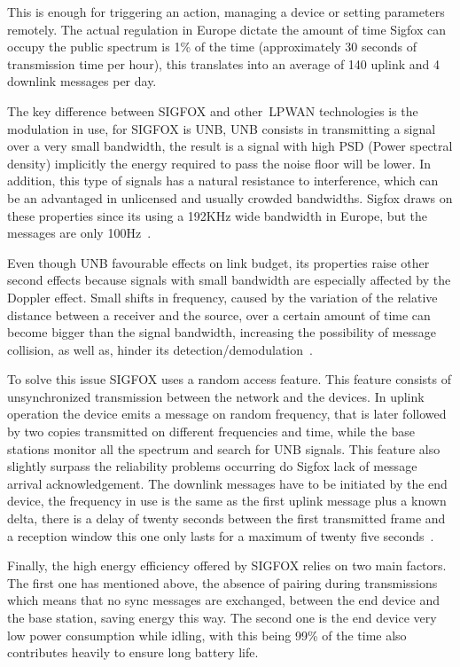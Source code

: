 This is enough for triggering an action, managing a device or setting parameters remotely. 
The actual regulation in Europe dictate the amount of time Sigfox can occupy the public spectrum is 1\% of the time (approximately 30 seconds of transmission time per hour), this translates into an average of 140 uplink and 4 downlink messages per day.

The key difference between SIGFOX and other~\gls{LPWAN} technologies is the modulation in use, for SIGFOX is UNB, UNB consists in transmitting a signal over a very small bandwidth, the result is a signal with high PSD (Power spectral density) implicitly the energy required to pass the noise floor will be lower. In addition, this type of signals has a natural resistance to interference, which can be an advantaged in unlicensed and usually crowded bandwidths. Sigfox draws on these properties since its using a 192KHz wide bandwidth in Europe, but the messages are only 100Hz~\cite{SIGTECH}.

Even though UNB favourable effects on link budget, its properties raise other second effects because signals with small bandwidth are especially affected by the  Doppler effect. Small shifts in frequency, caused by the variation of the relative distance between a receiver and the source, over a certain amount of time can become bigger than the signal bandwidth, increasing the possibility of message collision, as well as, hinder its detection/demodulation~\cite{Anteur2016}.

To solve this issue SIGFOX uses a random access feature. This feature consists of unsynchronized transmission between the network and the devices. In uplink operation the device emits a message on random frequency, that is later followed by two copies transmitted on different frequencies and time, while the base stations monitor all the spectrum and search for UNB signals. This feature also slightly surpass the  reliability problems occurring do  Sigfox lack of message arrival acknowledgement\cite{Mekki2019}. The downlink messages have to be initiated by the end device, the frequency in use is the same as the first uplink message plus a known delta, there is a delay of twenty seconds between the first transmitted frame and a reception window this one only lasts for a maximum of twenty five seconds~\cite{SIGTECH}.

Finally, the high energy efficiency offered by SIGFOX relies on two main factors. The first one has mentioned above, the absence of pairing during transmissions which means that no sync messages are exchanged, between the end device and the base station, saving energy this way. The second one is the end device very low power consumption while idling, with this being  99\% of the time also contributes heavily to ensure long battery life.


